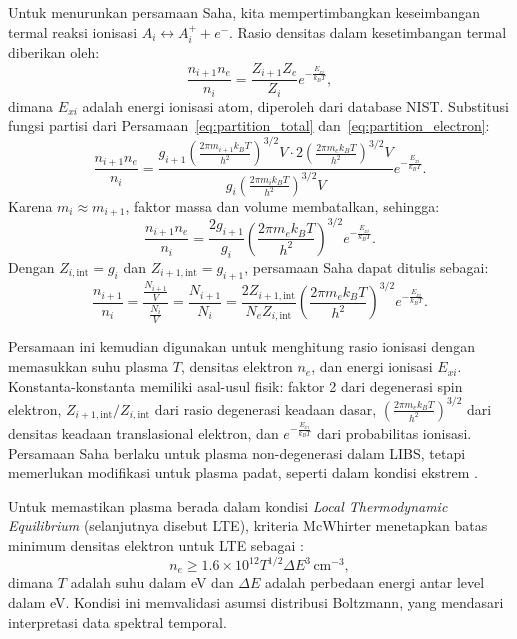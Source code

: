 Untuk menurunkan persamaan Saha, kita mempertimbangkan keseimbangan termal reaksi ionisasi \( A_i \leftrightarrow A_i^+ + e^- \). Rasio densitas dalam kesetimbangan termal diberikan oleh:
\begin{equation}
\frac{n_{i+1} n_e}{n_i} = \frac{Z_{i+1} Z_e}{Z_i} e^{-\frac{E_{xi}}{k_B T}}, \label{eq:saha_initial}
\end{equation}
dimana \( E_{xi} \) adalah energi ionisasi atom, diperoleh dari database NIST. Substitusi fungsi partisi dari Persamaan~\eqref{eq:partition_total} dan~\eqref{eq:partition_electron}:
\begin{equation}
\frac{n_{i+1} n_e}{n_i} = \frac{g_{i+1} \left( \frac{2\pi m_{i+1} k_B T}{h^2} \right)^{3/2} V \cdot 2 \left( \frac{2\pi m_e k_B T}{h^2} \right)^{3/2} V}{g_i \left( \frac{2\pi m_i k_B T}{h^2} \right)^{3/2} V} e^{-\frac{E_{xi}}{k_B T}}. \label{eq:saha_substitution}
\end{equation}
Karena \( m_i \approx m_{i+1} \), faktor massa dan volume membatalkan, sehingga:
\begin{equation}
\frac{n_{i+1} n_e}{n_i} = \frac{2 g_{i+1}}{g_i} \left( \frac{2\pi m_e k_B T}{h^2} \right)^{3/2} e^{-\frac{E_{xi}}{k_B T}}. \label{eq:saha_final}
\end{equation}
Dengan \( Z_{i,\text{int}} = g_i \) dan \( Z_{i+1,\text{int}} = g_{i+1} \), persamaan Saha dapat ditulis sebagai:
\begin{equation}
\frac{n_{i+1}}{n_i} = \frac{\frac{N_{i+1}}{V}} {\frac{N_{i}}{V}}= \frac{N_{i+1}} {N_{i}} = \frac{2Z_{i+1,\text{int}}}{N_eZ_{i,\text{int}}} \left( \frac{2\pi m_e k_B T}{h^2} \right)^{3/2} e^{-\frac{E_{xi}}{k_B T}}. \label{eq:saha_final_int}
\end{equation}

Persamaan ini kemudian digunakan untuk menghitung rasio ionisasi dengan memasukkan suhu plasma \( T \), densitas elektron \( n_e \), dan energi ionisasi \( E_{xi} \). Konstanta-konstanta memiliki asal-usul fisik: faktor 2 dari degenerasi spin elektron, \( Z_{i+1,\text{int}}/Z_{i,\text{int}} \) dari rasio degenerasi keadaan dasar, \( \left( \frac{2\pi m_e k_B T}{h^2} \right)^{3/2} \) dari densitas keadaan translasional elektron, dan \( e^{-\frac{E_{xi}}{k_B T}} \) dari probabilitas ionisasi. Persamaan Saha berlaku untuk plasma non-degenerasi dalam LIBS, tetapi memerlukan modifikasi untuk plasma padat, seperti dalam kondisi ekstrem \citep{Chandrasekhar1939}.

Untuk memastikan plasma berada dalam kondisi \textit{Local Thermodynamic Equilibrium} (selanjutnya disebut LTE), kriteria McWhirter menetapkan batas minimum densitas elektron untuk LTE sebagai \citep{McWhirter1965}:
\begin{equation}
n_e \geq 1.6 \times 10^{12} T^{1/2} \Delta E^3 \, \text{cm}^{-3}, \label{eq:mcwhirter}
\end{equation}
dimana \( T \) adalah suhu dalam eV dan \( \Delta E \) adalah perbedaan energi antar level dalam eV. Kondisi ini memvalidasi asumsi distribusi Boltzmann, yang mendasari interpretasi data spektral temporal.


